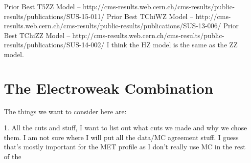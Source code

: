     Prior Best T5ZZ Model   -- http://cms-results.web.cern.ch/cms-results/public-results/publications/SUS-15-011/
    Prior Best TChiWZ Model -- http://cms-results.web.cern.ch/cms-results/public-results/publications/SUS-13-006/
    Prior Best TChiZZ Model -- http://cms-results.web.cern.ch/cms-results/public-results/publications/SUS-14-002/
    I think the HZ model is the same as the ZZ model.

\clearpage

\section{The Electroweak Combination}

The things we want to consider here are: 

  1. All the cuts and stuff, I want to list out what cuts we made and why we chose them. I am not sure where I will put all the data/MC agreement stuff. I guess that's mostly important for the MET profile as I don't really use MC in the rest of the
